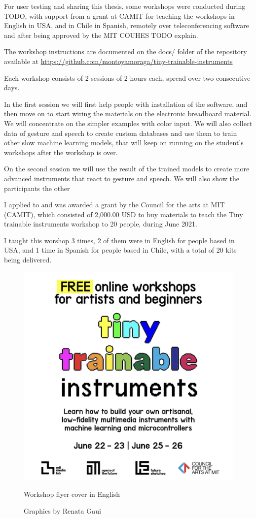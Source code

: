 For user testing and sharing this thesis, some workshops were conducted during TODO, with support from a grant at CAMIT for teaching the workshops in English in USA, and in Chile in Spanish, remotely over teleconferencing software and after being approved by the MIT COUHES TODO explain.

The workshop instructions are documented on the docs/ folder of the repository available at \url{https://github.com/montoyamoraga/tiny-trainable-instruments}

Each workshop consists of 2 sessions of 2 hours each, spread over two consecutive days.

In the first session we will first help people with installation of the software, and then move on to start wiring the materials on the electronic breadboard material. We will concentrate on the simpler examples with color input. We will also collect data of gesture and speech to create custom databases and use them to train other slow machine learning models, that will keep on running on the student's workshops after the workshop is over.

On the second session we will use the result of the trained models to create more advanced instruments that react to gesture and speech. We will also show the participants the other 

I applied to and was awarded a grant by the Council for the arts at MIT (CAMIT), which consisted of 2,000.00 USD to buy materials to teach the Tiny trainable instruments workshop to 20 people, during June 2021.

I taught this worshop 3 times, 2 of them were in English for people based in USA, and 1 time in Spanish for people based in Chile, with a total of 20 kits being delivered.

\begin{figure}[ht]
  \centering
  \includegraphics[width=0.75\linewidth,height=0.35\textheight,keepaspectratio]{images/workshop-en-1.jpg}
  \caption{Workshop flyer cover in English}
  \caption*{Graphics by Renata Gaui}
  \label{fig:workshop-english-flyer-page-1}
\end{figure}

